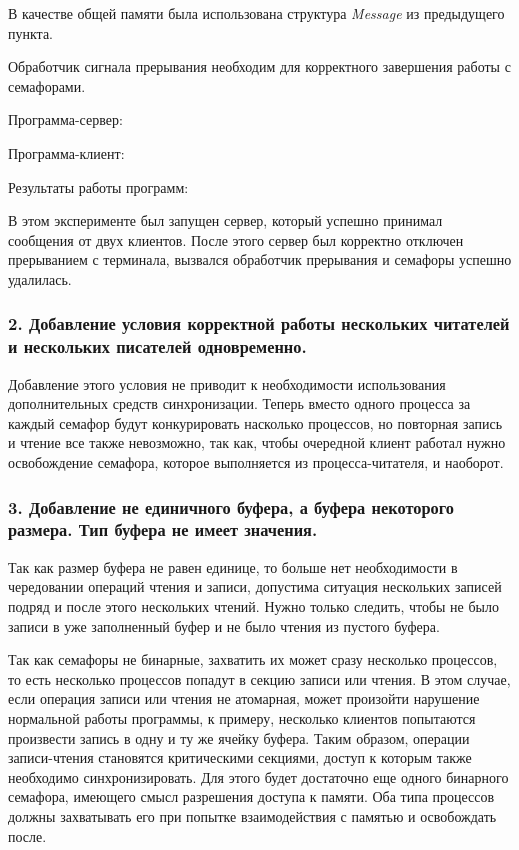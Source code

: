 \documentclass[14pt,a4paper,report]{report}
\begin{document}
В качестве общей памяти была использована структура \emph{Message} из предыдущего пункта.

Обработчик сигнала прерывания необходим для корректного завершения работы с семафорами.

Программа-сервер:



Программа-клиент:



Результаты работы программ:



В этом эксперименте был запущен сервер, который успешно принимал сообщения от двух клиентов. После этого сервер был корректно отключен прерыванием с терминала, вызвался обработчик прерывания и семафоры успешно удалилась.


\subsubsection{2. Добавление условия корректной работы нескольких читателей и нескольких писателей одновременно.}

Добавление этого условия не приводит к необходимости использования дополнительных средств синхронизации. Теперь вместо одного процесса за каждый семафор будут конкурировать насколько процессов, но повторная запись и чтение все также невозможно, так как, чтобы очередной клиент работал нужно освобождение семафора, которое выполняется из процесса-читателя, и наоборот.


\subsubsection{3. Добавление не единичного буфера, а буфера некоторого размера. Тип буфера не имеет значения.}

Так как размер буфера не равен единице, то больше нет необходимости в чередовании операций чтения и записи, допустима ситуация нескольких записей подряд и после этого нескольких чтений. Нужно только следить, чтобы не было записи в уже заполненный буфер и не было чтения из пустого буфера.

Так как семафоры не бинарные, захватить их может сразу несколько процессов, то есть несколько процессов попадут в секцию записи или чтения. В этом случае, если операция записи или чтения не атомарная, может произойти нарушение нормальной работы программы, к примеру, несколько клиентов попытаются произвести запись в одну и ту же ячейку буфера. Таким образом, операции записи-чтения становятся критическими секциями, доступ к которым также необходимо синхронизировать. Для этого будет достаточно еще одного бинарного семафора, имеющего смысл разрешения доступа к памяти. Оба типа процессов должны захватывать его при попытке взаимодействия с памятью и освобождать после.
\end{document}
